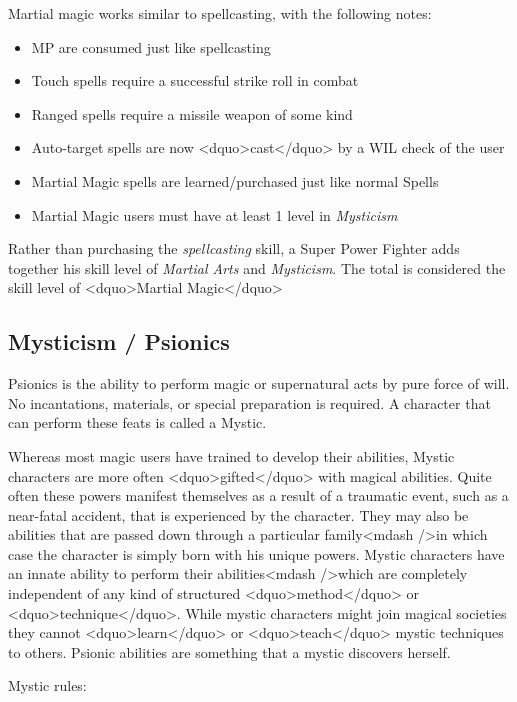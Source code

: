 Martial magic works similar to spellcasting, with the following notes:

\begin{itemize}
\item MP are consumed just like spellcasting
\item Touch spells require a successful strike roll in combat
\item Ranged spells require a missile weapon of some kind
\item Auto-target spells are now <dquo>cast</dquo> by a WIL check of the user
\item Martial Magic spells are learned/purchased just like normal Spells
\item Martial Magic users must have at least 1 level in \emph{Mysticism}
\end{itemize}

Rather than purchasing the \emph{spellcasting} skill, a Super Power
Fighter adds together his skill level of \emph{Martial Arts} and
\emph{Mysticism}.  The total is considered the skill level of
<dquo>Martial Magic</dquo>

\subsection{Mysticism / Psionics}

Psionics is the ability to perform magic or supernatural acts by pure
force of will.  No incantations, materials, or special preparation is
required.  A character that can perform these feats is called a
Mystic.

Whereas most magic users have trained to develop their abilities,
Mystic characters are more often <dquo>gifted</dquo> with magical abilities.
Quite often these powers manifest themselves as a result of a
traumatic event, such as a near-fatal accident, that is experienced by
the character.  They may also be abilities that are passed down
through a particular family<mdash />in which case the character is simply
born with his unique powers.  Mystic characters have an innate ability
to perform their abilities<mdash />which are completely independent of any
kind of structured <dquo>method</dquo> or <dquo>technique</dquo>.  While mystic
characters might join magical societies they cannot <dquo>learn</dquo> or
<dquo>teach</dquo> mystic techniques to others.  Psionic abilities are
something that a mystic discovers herself.

Mystic rules:

